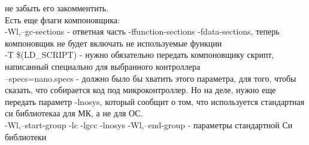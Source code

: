 \documentclass[12pt,a4paper]{article}
\begin{document}
    не забыть его закомментить.\\
    Есть еще флаги компоновщика:\\
    -Wl,--gc-sections - ответная часть -ffunction-sections -fdata-sections,
    теперь компоновщик не будет включать не используемые функции\\
    -T \$(LD_SCRIPT) - нужно обязательно передать компоновщику скрипт,
    написанный специально для выбранного контроллера\\
    --specs=nano.specs - должно было бы хватить этого параметра, для того,
    чтобы сказать, что собирается код под микроконтроллер. Но на деле, нужно
    еще передать параметр -lnosys, который сообщит о том, что используется
    стандартная си библиотекаа для МК, а не для ОС.\\
    -Wl,--start-group -lc -lgcc -lnosys -Wl,--end-group - параметры
    стандартной Си библиотеки
\end{document}
